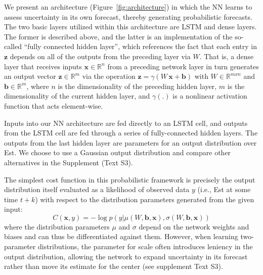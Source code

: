 \documentclass[draft,linenumbers]{agujournal2018}
\begin{document}
We present an architecture (Figure~\ref{fig:architecture}) in which the NN learns to assess uncertainty in its own forecast, thereby generating probabilistic forecasts. The two basic layers utilized within this architecture are LSTM and dense layers. The former is described above, and the latter is an implementation of the so-called ``fully connected hidden layer'', which references the fact that each entry in $\mathbf{z}$ depends on all of the outputs from the preceding layer via $W$. That is, a dense layer that receives inputs $\mathbf{x} \in \mathbb{R}^n$ from a preceding network layer in turn generates an output vector $\mathbf{z} \in \mathbb{R}^m$ via the operation $\mathbf{z} = \gamma(W\,\mathbf{x} + \mathbf{b})$ with $W \in \mathbb{R}^{mxn}$ and $\mathbf{b} \in \mathbb{R}^m$, where $n$ is the dimensionality of the preceding hidden layer, $m$ is the dimensionality of the current hidden layer, and $\gamma(.)$ is a nonlinear activation function that acts element-wise. 

Inputs into our NN architecture are fed directly to an LSTM cell, and outputs from the LSTM cell are fed through a series of fully-connected hidden layers. The outputs from the last hidden layer are parameters for an output distribution over Est. We choose to use a Gaussian output distribution and compare other alternatives in the Supplement (Text S3). 

The simplest cost function in this probabilistic framework is precisely the output distribution itself evaluated as a likelihood of observed data $y$ (i.e., Est at some time $t+k$) with respect to the distribution parameters generated from the given input:
\begin{equation}
C(\mathbf{x}, y) = -\log p\left( y \vert \mu(W, \mathbf{b}, \mathbf{x}), \sigma(W, \mathbf{b}, \mathbf{x})\right) \label{eq:output}
\end{equation}
where the distribution parameters $\mu$ and $\sigma$ depend on the network weights and biases and can thus be differentiated against them. However, when learning two-parameter distributions, the parameter for scale often introduces leniency in the output distribution, allowing the network to expand uncertainty in its forecast rather than move its estimate for the center (see supplement Text S3). 
\end{document}
